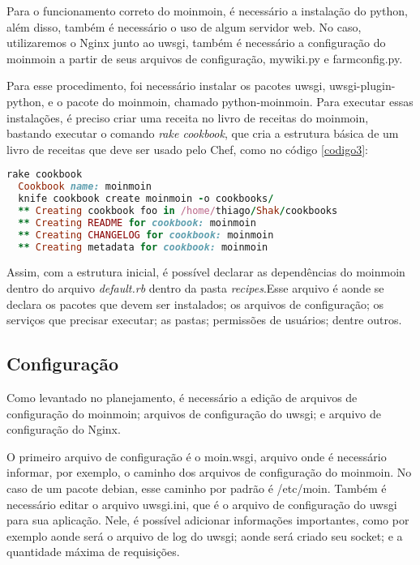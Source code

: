 Para o funcionamento correto do moinmoin, é necessário a instalação do python, além
disso, também é necessário o uso de algum servidor web. No caso, utilizaremos o Nginx
junto ao uwsgi, também é necessário a configuração do moinmoin a partir de seus
arquivos de configuração, mywiki.py e farmconfig.py.

Para esse procedimento, foi necessário instalar os pacotes uwsgi,
uwsgi-plugin-python, e o pacote do moinmoin, chamado python-moinmoin.
Para executar essas instalações, é preciso criar uma receita no livro de receitas
do moinmoin, bastando executar o comando \textit{rake cookbook}, que cria a
estrutura básica de um livro de receitas que deve ser usado pelo Chef, como no código
\ref{codigo3}:

\begin{lstlisting}[language=Ruby,label=dice_index,caption={Exemplo de criação de estrutura básica de livro de receitas do moinmoin com shak}, label=codigo3]
  rake cookbook
  Cookbook name: moinmoin
  knife cookbook create moinmoin -o cookbooks/
  ** Creating cookbook foo in /home/thiago/Shak/cookbooks
  ** Creating README for cookbook: moinmoin
  ** Creating CHANGELOG for cookbook: moinmoin
  ** Creating metadata for cookbook: moinmoin
\end{lstlisting}

Assim, com a estrutura inicial, é possível declarar as dependências do moinmoin
dentro do arquivo \textit{default.rb} dentro da pasta \textit{recipes}.Esse arquivo 
é aonde se declara os pacotes que devem ser instalados; os arquivos de configuração;
os serviços que precisar executar; as pastas; permissões de usuários; dentre outros.

\subsection{Configuração}

Como levantado no planejamento, é necessário a edição de arquivos de configuração
do moinmoin; arquivos de configuração do uwsgi; e arquivo de configuração
do Nginx.

O primeiro arquivo de configuração é o moin.wsgi, arquivo onde é necessário
informar, por exemplo, o caminho dos arquivos de configuração do moinmoin. No caso
de um pacote debian, esse caminho por padrão é  /etc/moin. Também é necessário 
editar o arquivo uwsgi.ini, que é o arquivo de configuração
do uwsgi para sua aplicação. Nele, é possível adicionar informações importantes, como
por exemplo aonde será o arquivo de log do uwsgi; aonde será criado seu socket;
e a quantidade máxima de requisições.

